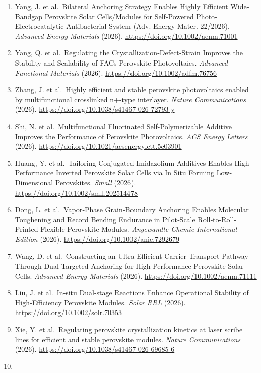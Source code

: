 \documentclass[
  11pt,
]{article}
\begin{document}
\begin{enumerate}
  \url{https://doi.org/10.1002/smll.74000}
\item
  Yang, J. et al.~Bilateral Anchoring Strategy Enables Highly Efficient
  Wide‐Bandgap Perovskite Solar Cells/Modules for Self‐Powered
  Photo‐Electrocatalytic Antibacterial System (Adv. Energy Mater.
  22/2026). \emph{Advanced Energy Materials} (2026).
  \url{https://doi.org/10.1002/aenm.71001}
\item
  Yang, Q. et al.~Regulating the Crystallization‐Defect‐Strain Improves
  the Stability and Scalability of FACs Perovskite Photovoltaics.
  \emph{Advanced Functional Materials} (2026).
  \url{https://doi.org/10.1002/adfm.76756}
\item
  Zhang, J. et al.~Highly efficient and stable perovskite photovoltaics
  enabled by multifunctional crosslinked n+-type interlayer.
  \emph{Nature Communications} (2026).
  \url{https://doi.org/10.1038/s41467-026-72793-y}
\item
  Shi, N. et al.~Multifunctional Fluorinated Self-Polymerizable Additive
  Improves the Performance of Perovskite Photovoltaics. \emph{ACS Energy
  Letters} (2026). \url{https://doi.org/10.1021/acsenergylett.5c03901}
\item
  Huang, Y. et al.~Tailoring Conjugated Imidazolium Additives Enables
  High‐Performance Inverted Perovskite Solar Cells via In Situ Forming
  Low‐Dimensional Perovskites. \emph{Small} (2026).
  \url{https://doi.org/10.1002/smll.202514478}
\item
  Dong, L. et al.~Vapor‐Phase Grain‐Boundary Anchoring Enables Molecular
  Toughening and Record Bending Endurance in Pilot‐Scale
  Roll‐to‐Roll‐Printed Flexible Perovskite Modules. \emph{Angewandte
  Chemie International Edition} (2026).
  \url{https://doi.org/10.1002/anie.7292679}
\item
  Wang, D. et al.~Constructing an Ultra‐Efficient Carrier Transport
  Pathway Through Dual‐Targeted Anchoring for High‐Performance
  Perovskite Solar Cells. \emph{Advanced Energy Materials} (2026).
  \url{https://doi.org/10.1002/aenm.71111}
\item
  Liu, J. et al.~In‐situ Dual‐stage Reactions Enhance Operational
  Stability of High‐Efficiency Perovskite Modules. \emph{Solar RRL}
  (2026). \url{https://doi.org/10.1002/solr.70353}
\item
  Xie, Y. et al.~Regulating perovskite crystallization kinetics at laser
  scribe lines for efficient and stable perovskite modules. \emph{Nature
  Communications} (2026).
  \url{https://doi.org/10.1038/s41467-026-69685-6}
\item

\end{enumerate}
\end{document}
